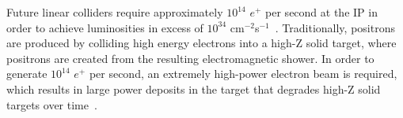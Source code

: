 \documentclass[
reprint,
nofootinbib,
amsmath, amssymb,
aps,
floatfix,
]{revtex4-2}
\begin{document}
Future linear colliders require approximately $10^{14}$ $e^+$ per second at the IP in order to achieve luminosities in excess of $10^{34}$ cm$^{-2}$s$^{-1}$~\cite{Seimiya2015}. Traditionally, positrons are produced by colliding high energy electrons into a high-Z solid target, where positrons are created from the resulting electromagnetic shower.  In order to generate $10^{14}$ $e^+$ per second, an extremely high-power electron beam is required,
which results in large power deposits in the target that degrades high-Z solid targets over time~\cite{Bharadwaj2001}.


\end{document}
